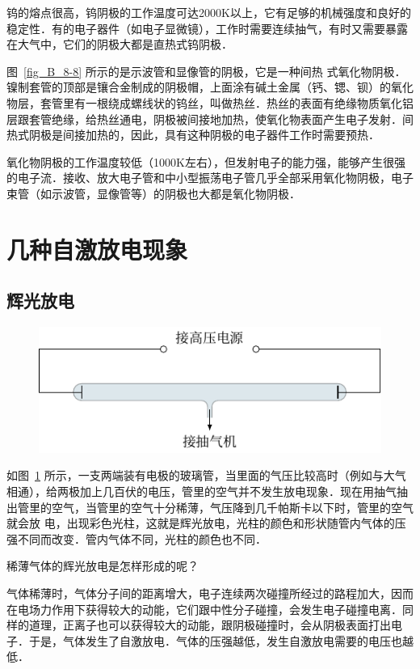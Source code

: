钨的熔点很高，钨阴极的工作温度可达2000K以上，它有足够的机械强度和良好的稳定性．有的电子器件（如电子显微镜），工作时需要连续抽气，有时又需要暴露在大气中，它们的阴极大都是直热式钨阴极．

图~\ref{fig_B_8-8} 所示的是示波管和显像管的阴极，它是一种间热
式氧化物阴极．镍制套管的顶部是镶合金制成的阴极帽，上面涂有碱土金属（钙、锶、钡）的氧化物层，套管里有一根绕成螺线状的钨丝，叫做热丝．热丝的表面有绝缘物质氧化铝层跟套管绝缘，给热丝通电，阴极被间接地加热，使氧化物表面产生电子发射．间热式阴极是间接加热的，因此，具有这种阴极的电子器件工作时需要预热．

氧化物阴极的工作温度较低（1000K左右），但发射电子的能力强，能够产生很强的电子流．接收、放大电子管和中小型振荡电子管几乎全部采用氧化物阴极，电子束管（如示波管，显像管等）的阴极也大都是氧化物阴极．

\section{几种自激放电现象}\label{sec_B-8-6}
\subsection{辉光放电}
\begin{figure}[htbp]
    \centering
    \includegraphics{fig/B/8-9.pdf}
    \caption{}\label{fig_B_8-9}
\end{figure}

如图~\ref{fig_B_8-9} 所示，一支两端装有电极的玻璃管，当里面的气压比较高时（例如与大气相通），给两极加上几百伏的电压，管里的空气并不发生放电现象．现在用抽气抽出管里的空气，当管里的空气十分稀薄，气压降到几千帕斯卡以下时，管里的空气就会放
电，出现彩色光柱，这就是辉光放电，光柱的颜色和形状随管内气体的压强不同而改变．管内气体不同，光柱的颜色也不同．

稀薄气体的辉光放电是怎样形成的呢？

气体稀薄时，气体分子间的距离增大，电子连续两次碰撞所经过的路程加大，因而在电场力作用下获得较大的动能，它们跟中性分子碰撞，会发生电子碰撞电离．同样的道理，正离子也可以获得较大的动能，跟阴极碰撞时，会从阴极表面打出电子．于是，气体发生了自激放电．气体的压强越低，发生自激放电需要的电压也越低．

